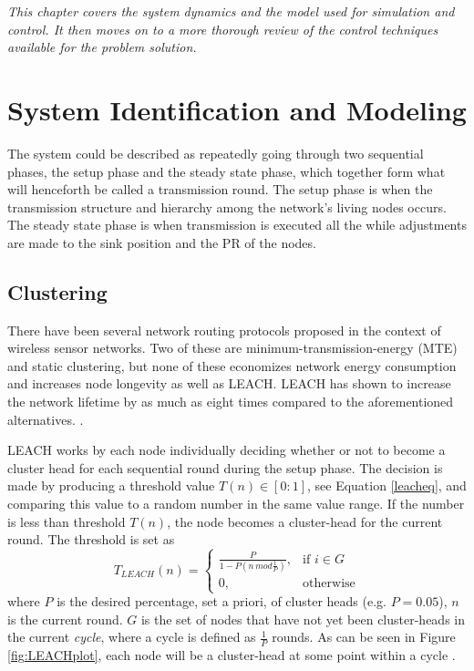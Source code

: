 \label{ch:LitReview}
\textit{This chapter covers the system dynamics and the model used for simulation and control. It then moves on to a more thorough review of the control techniques available for the problem solution.}

\section{System Identification and Modeling}
The system could be described as repeatedly going through two sequential phases, the setup phase and the steady state phase, which together form what will henceforth be called a transmission round. The setup phase is when the transmission structure and hierarchy among the network's living nodes occurs. The steady state phase is when transmission is executed all the while adjustments are made to the sink position and the PR of the nodes. 

\subsection{Clustering}
There have been several network routing protocols proposed in the context of wireless sensor networks. Two of these are minimum-transmission-energy (MTE) and static clustering, but none of these economizes network energy consumption and increases node longevity as well as LEACH. LEACH has shown to increase the network lifetime by as much as eight times compared to the aforementioned alternatives. \cite{heinzelman2000energy} .\newline

\noindent LEACH works by each node individually deciding whether or not to become a cluster head for each sequential round during the setup phase. The decision is made by producing a threshold value $T(n) \in [0:1]$, see Equation \ref{leacheq}, and comparing this value to a random number in the same value range. If the number is less than threshold $T(n)$, the node becomes a cluster-head for the current round. The threshold is set as
\begin{equation}
\label{leacheq}
    T_{LEACH}(n) = \begin{cases} \frac{P}{1-P(n\,mod\frac{1}{P})}, & \mbox{if } i \in G\\ 0, & \mbox{otherwise} \end{cases}
\end{equation}
where $P$ is the desired percentage, set a priori, of cluster heads (e.g. $P = 0.05$), $n$ is the current round. $G$ is the set of nodes that have not yet been cluster-heads in the current \textit{cycle}, where a cycle is defined as $\frac{1}{P}$ rounds. As can be seen in Figure \ref{fig:LEACHplot}, each node will be a cluster-head at some point within a cycle \cite{heinzelman2000energy}.\newline

